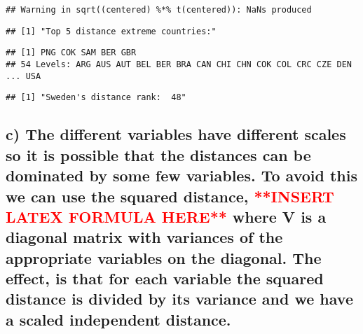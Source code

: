 \documentclass[]{article}
\begin{document}
\begin{verbatim}
## Warning in sqrt((centered) %*% t(centered)): NaNs produced
\end{verbatim}

\begin{verbatim}
## [1] "Top 5 distance extreme countries:"
\end{verbatim}

\begin{verbatim}
## [1] PNG COK SAM BER GBR
## 54 Levels: ARG AUS AUT BEL BER BRA CAN CHI CHN COK COL CRC CZE DEN ... USA
\end{verbatim}

\begin{verbatim}
## [1] "Sweden's distance rank:  48"
\end{verbatim}

\hypertarget{c-the-different-variables-have-different-scales-so-it-is-possible-that-the-distances-can-be-dominated-by-some-few-variables.-to-avoid-this-we-can-use-the-squared-distance-where-v-is-a-diagonal-matrix-with-variances-of-the-appropriate-variables-on-the-diagonal.-the-effect-is-that-for-each-variable-the-squared-distance-is-divided-by-its-variance-and-we-have-a-scaled-independent-distance.}{%
\subsection{\texorpdfstring{c) The different variables have different
scales so it is possible that the distances can be dominated by some few
variables. To avoid this we can use the squared distance,
\textcolor{red}{**INSERT LATEX FORMULA HERE**} where V is a diagonal
matrix with variances of the appropriate variables on the diagonal. The
effect, is that for each variable the squared distance is divided by its
variance and we have a scaled independent
distance.}{c) The different variables have different scales so it is possible that the distances can be dominated by some few variables. To avoid this we can use the squared distance,  where V is a diagonal matrix with variances of the appropriate variables on the diagonal. The effect, is that for each variable the squared distance is divided by its variance and we have a scaled independent distance.}}\label{c-the-different-variables-have-different-scales-so-it-is-possible-that-the-distances-can-be-dominated-by-some-few-variables.-to-avoid-this-we-can-use-the-squared-distance-where-v-is-a-diagonal-matrix-with-variances-of-the-appropriate-variables-on-the-diagonal.-the-effect-is-that-for-each-variable-the-squared-distance-is-divided-by-its-variance-and-we-have-a-scaled-independent-distance.}}
\end{document}

